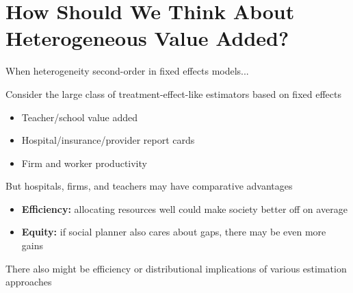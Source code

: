 \documentclass[t,aspectratio=169,11pt]{beamer}
\begin{document}

\section{How Should We Think About Heterogeneous Value Added?}



\begin{frame}{When heterogeneity second-order in fixed effects models...}


\begin{wideitemize}
    \item Consider the large class of treatment-effect-like estimators based on fixed effects
    \begin{itemize}
        \item Teacher/school value added
        \item Hospital/insurance/provider report cards
        \item Firm and worker productivity
    \end{itemize}
    
    \item But hospitals, firms, and teachers may have comparative advantages
    \begin{itemize}
        \item \textbf{Efficiency:} allocating resources well could make society better off on average
        \item \textbf{Equity:} if social planner also cares about gaps, there may be even more gains
    \end{itemize}
    
    \item There also might be efficiency or distributional implications of various estimation approaches
    
\end{wideitemize}
\end{frame}


\end{document}
